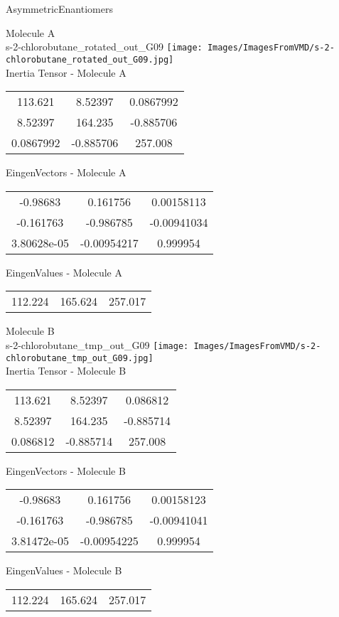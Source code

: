 \vtab[-2cm]
\begin{center}
{\large AsymmetricEnantiomers}
\end{center}
\begin{multicols}{2}
\begin{center}
Molecule A \\ 
s-2-chlorobutane\_rotated\_out\_G09
\texttt{[image: Images/ImagesFromVMD/s-2-chlorobutane\_rotated\_out\_G09.jpg]}
\\
Inertia Tensor - Molecule A \\
\vtab
\begin{tabular}{|c c c|}
113.621	 & 	8.52397	 & 	0.0867992	 \\
8.52397	 & 	164.235	 & 	-0.885706	 \\
0.0867992	 & 	-0.885706	 & 	257.008
\end{tabular}

\vtab
 EingenVectors - Molecule A     \\
\vtab
\begin{tabular}{|c c c|}
-0.98683	 & 	0.161756	 & 	0.00158113	 \\
-0.161763	 & 	-0.986785	 & 	-0.00941034	 \\
3.80628e-05	 & 	-0.00954217	 & 	0.999954
\end{tabular}

\vtab
 EingenValues - Molecule A     \\
\vtab
\begin{tabular}{|c c c|}
112.224	 & 	165.624	 & 	257.017
\end{tabular}
\columnbreak

Molecule B \\ 
s-2-chlorobutane\_tmp\_out\_G09
\texttt{[image: Images/ImagesFromVMD/s-2-chlorobutane\_tmp\_out\_G09.jpg]}
\\
Inertia Tensor - Molecule B \\
\vtab
\begin{tabular}{|c c c|}
113.621	 & 	8.52397	 & 	0.086812	 \\
8.52397	 & 	164.235	 & 	-0.885714	 \\
0.086812	 & 	-0.885714	 & 	257.008
\end{tabular}

\vtab
 EingenVectors - Molecule B     \\
\vtab
\begin{tabular}{|c c c|}
-0.98683	 & 	0.161756	 & 	0.00158123	 \\
-0.161763	 & 	-0.986785	 & 	-0.00941041	 \\
3.81472e-05	 & 	-0.00954225	 & 	0.999954
\end{tabular}

\vtab
 EingenValues - Molecule B     \\
\vtab
\begin{tabular}{|c c c|}
112.224	 & 	165.624	 & 	257.017
\end{tabular}

\end{center}
\end{multicols}
